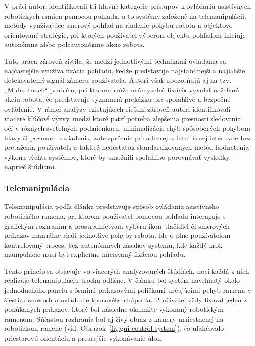 V práci \cite{A_scoping_review_of_gaze_and_eye_tracking-based_control_methods_for_assistive_robotic_arms} autori identifikovali tri hlavné kategórie prístupov k ovládaniu asistívnych robotických ramien pomocou pohľadu, a to systémy založené na telemanipulácii, metódy využívajúce smerový pohľad na riadenie pohybu robota a objektovo orientované stratégie, pri ktorých používateľ výberom objektu pohľadom iniciuje autonómne alebo poloautonómne akcie robota.

Táto práca zároveň zistila, že medzi jednotlivými technikami ovládania sa najčastejšie využíva fixácia pohľadu, keďže predstavuje najstabilnejší a najľahšie detekovateľný signál zámeru používateľa. Autori však upozorňujú aj na tzv. „Midas touch“ problém, pri ktorom môže neúmyselná fixácia vyvolať neželanú akciu robota, čo predstavuje významnú prekážku pre spoľahlivé a bezpečné ovládanie. V rámci analýzy existujúcich riešení zároveň autori identifikovali viaceré kľúčové výzvy, medzi ktoré patrí potreba zlepšenia presnosti sledovania očí v rôznych svetelných podmienkach, minimalizácia chýb spôsobených pohybom hlavy či posunom zariadenia, zabezpečenie prirodzenej a intuitívnej interakcie bez preťaženia používateľa a taktiež nedostatok štandardizovaných metód hodnotenia výkonu týchto systémov, ktoré by umožnili spoľahlivo porovnávať výsledky naprieč štúdiami.

\subsubsection{Telemanipulácia}
Telemanipulácia podľa článku \cite{A_scoping_review_of_gaze_and_eye_tracking-based_control_methods_for_assistive_robotic_arms} predstavuje spôsob ovládania asistívneho robotického ramena, pri ktorom používateľ pomocou pohľadu interaguje s grafickým rozhraním a prostredníctvom výberu ikon, tlačidiel či smerových príkazov manuálne riadi jednotlivé pohyby robota. Ide o plne používateľom kontrolovaný proces, bez autonómnych zásahov systému, kde každý krok manipulácie musí byť explicitne iniciovaný fixáciou pohľadu.

Tento princíp sa objavuje vo viacerých analyzovaných štúdiách, hoci každá z nich realizuje telemanipuláciu trochu odlišne. V článku \cite{Eye-tracking-based_robotic_arm_control_system} bol systém navrhnutý okolo jednoduchého panelu s ôsmimi príkazovými políčkami určujúcimi pohyb ramena v šiestich smeroch a ovládanie koncového chápadla. Používateľ vždy fixoval jeden z ponúkaných príkazov, ktorý bol následne okamžite vykonaný robotickým ramenom. Súčasťou rozhrania bol aj živý obraz z kamery umiestnenej na robotickom ramene (vid. Obrázok~\ref{fig:gui-control-system}), čo uľahčovalo priestorovú orientáciu a presnejšie vykonávanie úloh.

